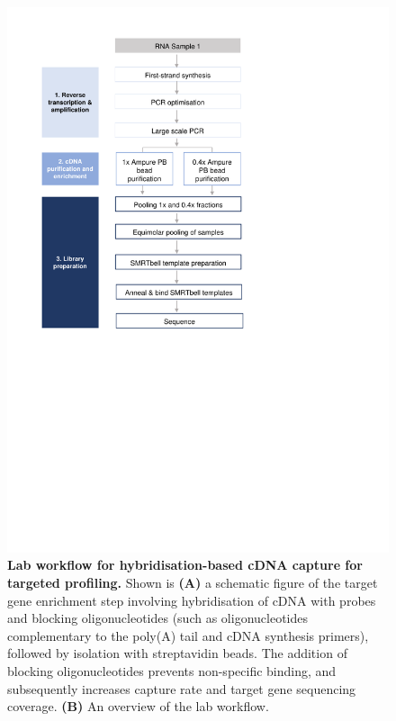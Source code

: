 \begin{figure}[!h]
	\begin{center}
		\includegraphics[page=12,trim={0cm 6cm 0cm 1cm},clip,scale = 0.70]{Figures/ProjectDevelopment_Figures.pdf}
	\end{center}
	\captionsetup{width=0.95\textwidth}
	\caption[Lab workflow for hybridisation-based cDNA capture for targeted profiling]%
	{\textbf{Lab workflow for hybridisation-based cDNA capture for targeted profiling.} Shown is \textbf{(A)} a schematic figure of the target gene enrichment step involving hybridisation of cDNA with probes and blocking oligonucleotides (such as oligonucleotides complementary to the poly(A) tail and cDNA synthesis primers), followed by isolation with streptavidin beads. The addition of blocking oligonucleotides prevents non-specific binding, and subsequently increases capture rate and target gene sequencing coverage. \textbf{(B)} An overview of the lab workflow.}
	\label{fig:isoseq_targetcapture}
\end{figure}

